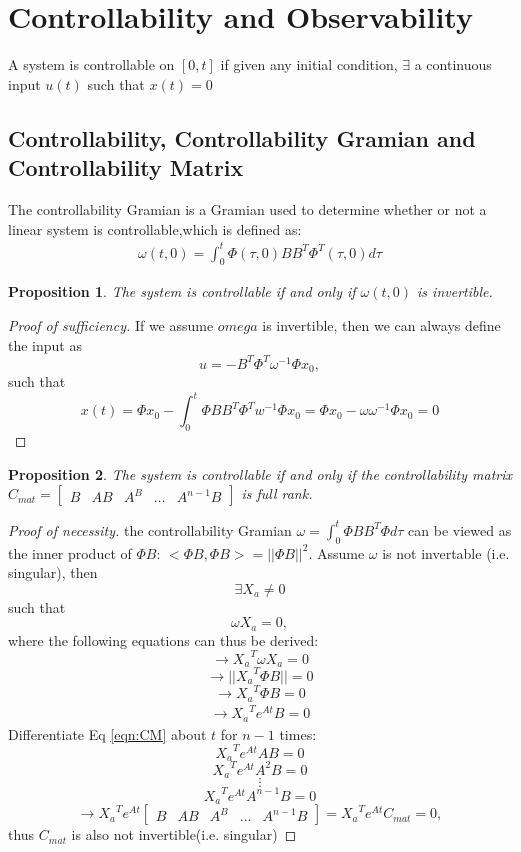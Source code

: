 \documentclass{article}
\newtheorem{prop}{Proposition}
\begin{document}
\section{Controllability and Observability}
A system is controllable on $[0,t]$ if given any initial condition, $\exists$ a continuous input $u(t)$ such that $x(t)=0$
\subsection{Controllability, Controllability Gramian and Controllability Matrix}
The controllability Gramian is a Gramian used to determine whether or not a linear system is controllable,which is defined as:
\begin{align}
\label{eqn:gc}
\omega(t,0)=\int_0^t\Phi (\tau,0)BB^T\Phi^T(\tau,0)d\tau
\end{align}

\begin{prop}
The system is controllable if and only if $\omega(t,0)$ is invertible.
\end{prop}
\begin{proof}[Proof of sufficiency]
If we assume $omega$ is invertible, then we can always define the input as
\[u=-B^T\Phi^T\omega^{-1}\Phi x_0,\] such that
\[x(t)=\Phi x_0-\int_0^t\Phi BB^T\Phi^Tw^{-1}\Phi x_0=\Phi x_0-\omega\omega^{-1}\Phi x_0=0\]
\end{proof}

\begin{prop}
The system is controllable if and only if the controllability matrix $C_{mat}= \left[ \begin{array}{ccccc} B & AB & A^B & \dots & A^{n-1}B \end{array} \right]$ is full rank.
\end{prop}
\begin{proof}[Proof of necessity]
the controllability Gramian $\omega=\int_0^t\Phi BB^T\Phi d\tau$ can be viewed as the inner product of $\Phi B$: $<\Phi B,\Phi B>=||\Phi B||^2$. Assume $\omega$ is not invertable (i.e. singular), then 
\[\exists X_a\neq0\] such that \[\omega X_a=0,\]
where the following equations can thus be derived:
\[\rightarrow {X_a}^T\omega{X_a}=0\]
\[\rightarrow ||{X_a}^T\Phi B||=0\]
\[\rightarrow {X_a}^T\Phi B=0\]
\begin{align}
\label{eqn:CM}
\rightarrow {X_a}^Te^{At} B=0
\end{align}
Differentiate Eq \eqref{eqn:CM} about $t$ for $n-1$ times:
\[{X_a}^Te^{At} AB=0\]
\[{X_a}^Te^{At} A^2B=0\]
\[\vdots\]
\[{X_a}^Te^{At} A^{n-1}B=0\]
\[\rightarrow {X_a}^Te^{At}\left[ \begin{array}{ccccc} B & AB & A^B & \dots & A^{n-1}B \end{array} \right]={X_a}^Te^{At}C_{mat}=0,\]
thus $C_{mat}$ is also not invertible(i.e. singular)
\end{proof}
\end{document}
